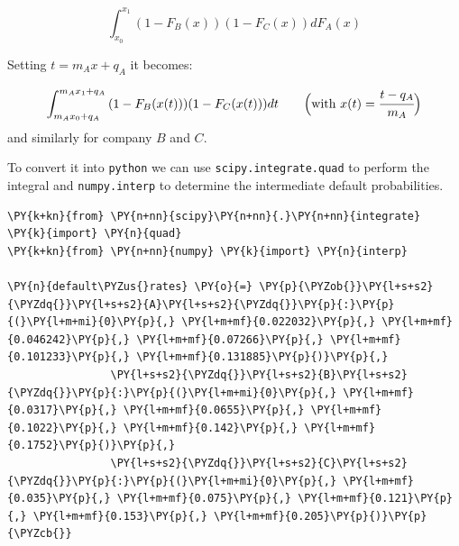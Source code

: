\[ \int_{x_0}^{x_1}{(1-F_B(x))(1-F_C(x))dF_A(x)}\]

Setting \(t=m_A x + q_A\) it becomes:

\[ \int_{m_A x_0 + q_A}^{m_A x_1 + q_A}{(1-F_B(x(t)))(1-F_C(x(t)))dt}\qquad\Big(\textrm{with}~x(t) = \cfrac{t -q_A}{m_A}\Big) \]
and similarly for company $B$ and $C$.

To convert it into \texttt{python} we can use \texttt{scipy.integrate.quad} to
perform the integral and \texttt{numpy.interp} to determine the
intermediate default probabilities.

\begin{tcolorbox}[breakable, size=fbox, boxrule=1pt, pad at break*=1mm,colback=cellbackground, colframe=cellborder]
\begin{Verbatim}[commandchars=\\\{\}]
\PY{k+kn}{from} \PY{n+nn}{scipy}\PY{n+nn}{.}\PY{n+nn}{integrate} \PY{k}{import} \PY{n}{quad}
\PY{k+kn}{from} \PY{n+nn}{numpy} \PY{k}{import} \PY{n}{interp}
	
\PY{n}{default\PYZus{}rates} \PY{o}{=} \PY{p}{\PYZob{}}\PY{l+s+s2}{\PYZdq{}}\PY{l+s+s2}{A}\PY{l+s+s2}{\PYZdq{}}\PY{p}{:}\PY{p}{(}\PY{l+m+mi}{0}\PY{p}{,} \PY{l+m+mf}{0.022032}\PY{p}{,} \PY{l+m+mf}{0.046242}\PY{p}{,} \PY{l+m+mf}{0.07266}\PY{p}{,} \PY{l+m+mf}{0.101233}\PY{p}{,} \PY{l+m+mf}{0.131885}\PY{p}{)}\PY{p}{,}
                \PY{l+s+s2}{\PYZdq{}}\PY{l+s+s2}{B}\PY{l+s+s2}{\PYZdq{}}\PY{p}{:}\PY{p}{(}\PY{l+m+mi}{0}\PY{p}{,} \PY{l+m+mf}{0.0317}\PY{p}{,} \PY{l+m+mf}{0.0655}\PY{p}{,} \PY{l+m+mf}{0.1022}\PY{p}{,} \PY{l+m+mf}{0.142}\PY{p}{,} \PY{l+m+mf}{0.1752}\PY{p}{)}\PY{p}{,}
                \PY{l+s+s2}{\PYZdq{}}\PY{l+s+s2}{C}\PY{l+s+s2}{\PYZdq{}}\PY{p}{:}\PY{p}{(}\PY{l+m+mi}{0}\PY{p}{,} \PY{l+m+mf}{0.035}\PY{p}{,} \PY{l+m+mf}{0.075}\PY{p}{,} \PY{l+m+mf}{0.121}\PY{p}{,} \PY{l+m+mf}{0.153}\PY{p}{,} \PY{l+m+mf}{0.205}\PY{p}{)}\PY{p}{\PYZcb{}}
	

\end{Verbatim}
\end{tcolorbox}
